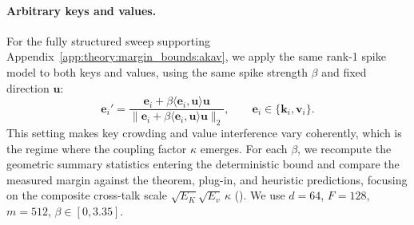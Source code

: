 \paragraph{Arbitrary keys and values.}
\label{app:exp:section4:anisotropic-keys-values}
For the fully structured sweep supporting Appendix~\ref{app:theory:margin_bounds:akav}, we apply the same rank-1 spike model to both keys and values, using the same spike strength $\beta$ and fixed direction $\mathbf{u}$:
\[
\mathbf{e}_{i}'
=
\frac{\mathbf{e}_{i} + \beta \langle \mathbf{e}_{i}, \mathbf{u}\rangle \mathbf{u}}
{\|\mathbf{e}_{i} + \beta \langle \mathbf{e}_{i}, \mathbf{u}\rangle \mathbf{u}\|_2},
\qquad
\mathbf{e}_{i}\in\{\mathbf{k}_{i},\mathbf{v}_{i}\}.
\]
This setting makes key crowding and value interference vary coherently, which is the regime where the coupling factor $\kappa$ emerges.
For each $\beta$, we recompute the geometric summary statistics entering the deterministic bound and compare the measured margin against the theorem, plug-in, and heuristic predictions, focusing on the composite cross-talk scale $\sqrt{E_K}\sqrt{E_v}\,\kappa$ ().
We use $d=64$, $F=128$, $m=512$, $\beta\in[0,3.35]$.

